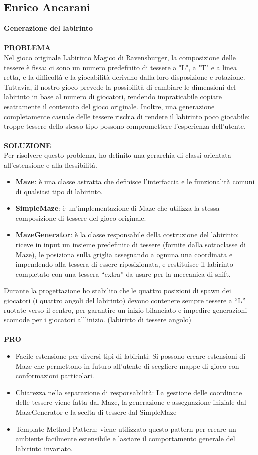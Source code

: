 \documentclass[a4paper,12pt]{report}
\begin{document}
\newpage
\subsection{Enrico Ancarani}
\textbf{Generazione del labirinto}
\\
\\
\textbf{PROBLEMA}\\
Nel gioco originale Labirinto Magico di Ravensburger, la composizione delle tessere è fissa: ci sono un numero predefinito di tessere a "L", a "T" e a linea retta, 
e la difficoltà e la giocabilità derivano dalla loro disposizione e rotazione. Tuttavia, il nostro gioco prevede la possibilità di cambiare le dimensioni del labirinto 
in base al numero di giocatori, rendendo impraticabile copiare esattamente il contenuto del gioco originale.
Inoltre, una generazione completamente casuale delle tessere rischia di rendere il labirinto poco giocabile: troppe tessere dello stesso tipo 
possono compromettere l’esperienza dell’utente.\\
\\
\textbf{SOLUZIONE}\\
Per risolvere questo problema, ho definito una gerarchia di classi orientata all’estensione e alla flessibilità.
\begin{itemize}
	\item \textbf{Maze}: è una classe astratta che definisce l’interfaccia e le funzionalità comuni di qualsiasi tipo di labirinto.
	\item \textbf{SimpleMaze}: è un’implementazione di Maze che utilizza la stessa composizione di tessere del gioco originale.
	\item \textbf{MazeGenerator}: è la classe responsabile della costruzione del labirinto: riceve in input un insieme predefinito di tessere 
	(fornite dalla sottoclasse di Maze), le posiziona sulla griglia assegnando a ognuna una coordinata e impendendo alla tessera di 
	essere riposizionata, e restituisce il labirinto completato con una tessera “extra” da usare per la meccanica di shift.
\end{itemize}
Durante la progettazione ho stabilito che le quattro posizioni di spawn dei giocatori (i quattro angoli del labirinto) 
devono contenere sempre tessere a “L” ruotate verso il centro, per garantire un inizio bilanciato e impedire generazioni scomode per i giocatori all'inizio. (labirinto di tessere angolo)
\\
\\
\textbf{PRO}
\begin{itemize}
	\item Facile estensione per diversi tipi di labirinti: Si possono creare estensioni di Maze che permettono in futuro all'utente di scegliere mappe di gioco con conformazioni 
	particolari.
	\item Chiarezza nella separazione di responsabilità: La gestione delle coordinate delle tessere viene fatta dal Maze, la generazione e assegnazione iniziale dal MazeGenerator e 
	la scelta di tessere dal SimpleMaze
	\item Template Method Pattern: viene utilizzato questo pattern per creare un ambiente facilmente estensibile e lasciare il comportamento generale del labirinto invariato.
\end{itemize}
\end{document}
